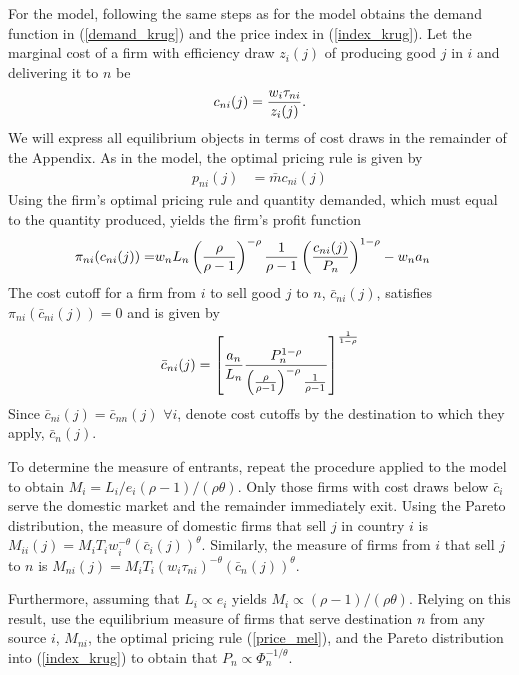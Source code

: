 \documentclass[12pt,dvips, ps2pdf]{article}
\begin{document}
\begin{appendix}
For the \citet{mel03} model, following the same steps as for the \citet{krug80} model obtains the demand function in (\ref{demand_krug}) and the price index in (\ref{index_krug}). Let the marginal cost of a firm with efficiency draw $z_i(j)$ of producing good $j$ in $i$ and delivering it to $n$ be
\begin{align}
c_{ni}(j)=\frac{w_i\tau_{ni}}{z_i(j)}.\notag
\end{align}
We will express all equilibrium objects in terms of cost draws in the remainder of the Appendix. As in the \citet{krug80} model, the optimal pricing rule is given by
\begin{align}
p_{ni}(j)&=\bar mc_{ni}(j)\label{price_mel}
\end{align}
Using the firm's optimal pricing rule and quantity demanded, which must equal to the quantity produced, yields the firm's profit function
\begin{align}
\pi_{ni}({c}_{ni}(j))=&w_nL_n \left(\frac{\rho}{\rho-1}\right)^{-\rho}\frac{1}{\rho-1}\left(\frac{c_{ni}(j)}{ P_n}\right)^{1-\rho}-w_na_n\notag
\end{align}
The cost cutoff for a firm from $i$ to sell good $j$ to $n$, $\bar c_{ni}(j)$, satisfies $\pi_{ni}(\bar c_{ni}(j))=0$ and is given by
\begin{align}
\bar{c}_{ni}(j)=\left[\frac{a_n}{L_n}\frac{  P_n^{1-\rho}}{\left(\frac{\rho}{\rho-1}\right)^{-\rho}\frac{1}{\rho-1}}\right]^{\frac{1}{1-\rho}}\notag
\end{align}
Since $\bar{c}_{ni}(j)=\bar{c}_{nn}(j)$ $\forall i$, denote cost cutoffs by the destination to which they apply, $\bar{c}_n(j)$.

To determine the measure of entrants, repeat the procedure applied to the \citet{krug80} model to obtain $M_i=L_i/e_i(\rho-1)/(\rho\theta)$. Only those firms with cost draws below $\bar c_i$ serve the domestic market and the remainder immediately exit. Using the Pareto distribution, the measure of domestic firms that sell $j$ in country $i$ is $M_{ii}(j)=M_iT_iw_i^{-\theta}(\bar c_i(j))^\theta$. Similarly, the measure of firms from $i$ that sell $j$ to $n$ is $M_{ni}(j)=M_iT_i(w_i\tau_{ni})^{-\theta}(\bar c_n(j))^\theta$.

Furthermore, assuming that $L_i\propto e_i$ yields $M_i\propto (\rho-1)/(\rho\theta)$. Relying on this result, use the equilibrium measure of firms that serve destination $n$ from any source $i$, $M_{ni}$, the optimal pricing rule (\ref{price_mel}), and the Pareto distribution into (\ref{index_krug}) to obtain that $P_n\propto \Phi_n^{-{1}/{\theta}}$.


\end{appendix}
\end{document}
